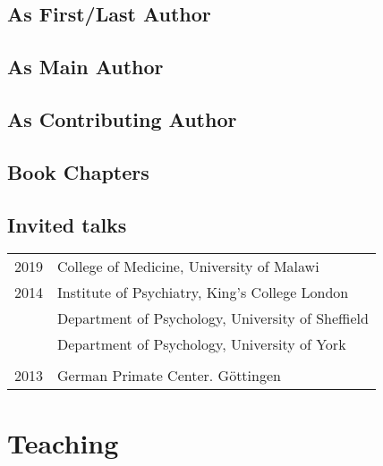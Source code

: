 \documentclass[11pt]{article}
\begin{document}
\subsection*{As First/Last Author}

\printbibliography[type=article,keyword=lead,heading=none]

\subsection*{As Main Author}

\printbibliography[type=article,keyword=main,heading=none]

\subsection*{As Contributing Author}

\printbibliography[type=article,keyword=contrib,heading=none]

\subsection*{Book Chapters}

\printbibliography[type=inbook,heading=none]

\subsection*{Invited talks}

\begin{tabular}{p{3cm}p{12cm}}
	
2019 & College of Medicine, University of Malawi \\
	
2014 & Institute of Psychiatry, King's College London \\

     & Department of Psychology, University of Sheffield \\

    & Department of Psychology, University of York \\ \\

2013 & German Primate Center. Göttingen

\end{tabular}


\section*{Teaching}
\end{document}
